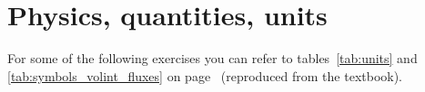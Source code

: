 \documentclass[a4paper,12pt,%
onecolumn,oneside,%
british%
]{memoir}
\newcommand{\addchap}[1]{\chapter*[#1]{#1}\addcontentsline{toc}{chapter}{#1}}
\renewcommand*{\|}[1][]{\nonscript\:#1\vert\nonscript\:\mathopen{}}
\begin{document}
\setlength{\epigraphwidth}{0.67\linewidth}
\epigraphfontsize{\footnotesize}
\setlength{\epigraphrule}{0pt}




\clearpage
{}
\setlength{\cftsectionnumwidth}{2.75em}
\tableofcontents*
\label{sec:toc}

\setcounter{chapter}{0}








\printpagenotes*
\clearpage
\chapter{Physics, quantities, units}
\label{cha:physics_quantities_units}
\setcounter{section}{-1}

For some of the following exercises you can refer to tables~\ref{tab:units} and \ref{tab:symbols_volint_fluxes} on page~\pageref{tab:units} (reproduced from the textbook).

\section{}
\end{document}
